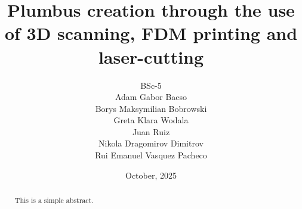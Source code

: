 \documentclass[12pt,a4paper]{report}
\begin{document}
\title{Plumbus creation through the use of 3D scanning, FDM printing and
laser-cutting}

\author{
  BSc-5 \\[1em]
  Adam Gabor Bacso \\
  Borys Maksymilian Bobrowski \\
  Greta Klara Wodala \\
  Juan Ruiz \\
  Nikola Dragomirov Dimitrov \\
  Rui Emanuel Vasquez Pacheco
}

\date{October, 2025}
\maketitle

\begin{abstract}
  This is a simple abstract.
\end{abstract}
\end{document}
